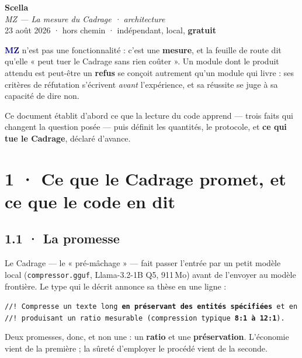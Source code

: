 \documentclass[10pt]{article}
\newcommand{\code}[1]{\texttt{\small #1}}
\newcommand{\mm}[1]{\textbf{\textcolor{navy}{#1}}}
\begin{document}
\begin{center}
{\Huge\bfseries\color{navy} Scella}\\[4pt]
{\large\color{grey}\itshape MZ --- La mesure du Cadrage · architecture}\\[4pt]
{\small\color{grey} 23 août 2026 \; · \; hors chemin \; · \; indépendant, local, \textbf{gratuit}}
\end{center}
\vspace{2pt}

\begin{these}
\small \mm{MZ} n'est pas une fonctionnalité : c'est une \textbf{mesure}, et la feuille de route dit
qu'elle « peut tuer le Cadrage sans rien coûter ». Un module dont le produit attendu est peut-être un
\textbf{refus} se conçoit autrement qu'un module qui livre : ses critères de réfutation s'écrivent
\emph{avant} l'expérience, et sa réussite se juge à sa capacité de dire non.

Ce document établit d'abord ce que la lecture du code apprend --- trois faits qui changent la
question posée --- puis définit les quantités, le protocole, et \textbf{ce qui tue le Cadrage},
déclaré d'avance.
\end{these}

\section{1 · Ce que le Cadrage promet, et ce que le code en dit}

\subsection{1.1 · La promesse}

Le Cadrage --- le « pré-mâchage » --- fait passer l'entrée par un petit modèle local
(\code{compressor.gguf}, Llama-3.2-1B Q5, 911\,Mo) avant de l'envoyer au modèle frontière. Le type
qui le décrit annonce sa thèse en une ligne :

\begin{extrait}\small
\code{//! Compresse un texte long \textbf{en préservant des entités spécifiées} et en}\\
\code{//! produisant un ratio mesurable (compression typique \textbf{8:1 à 12:1}).}
\end{extrait}

Deux promesses, donc, et non une : un \textbf{ratio} et une \textbf{préservation}. L'économie vient
de la première ; la sûreté d'employer le procédé vient de la seconde.
\end{document}
